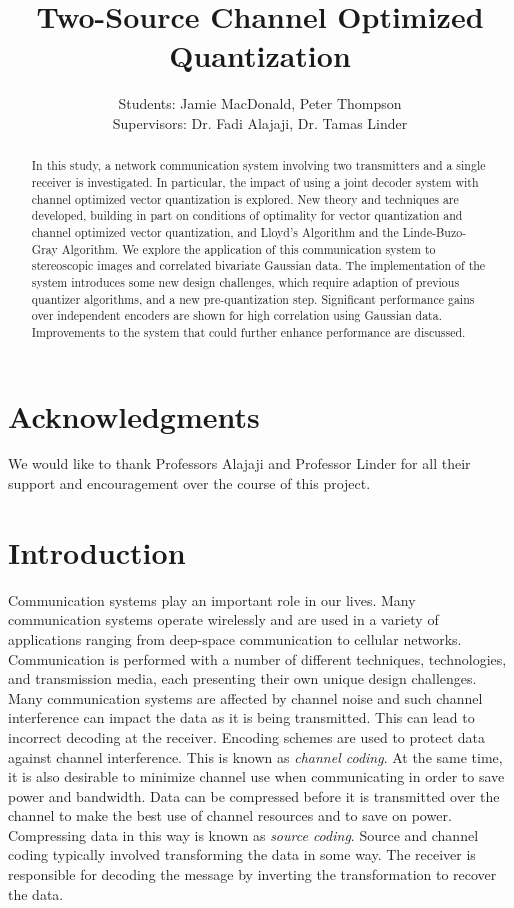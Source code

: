 \documentclass[10pt,twoside,titlepage]{article}
\begin{document}
\title{Two-Source Channel Optimized Quantization}
\author{Students: Jamie MacDonald, Peter Thompson  \\ Supervisors: Dr. Fadi Alajaji, Dr. Tamas Linder}
\maketitle


\section{Acknowledgments}
We would like to thank Professors Alajaji and Professor Linder for all their support and encouragement over the course of this project.

\begin{abstract}
In this study, a network communication system involving two transmitters and a single receiver is investigated. In particular, the impact of using a joint decoder system with channel optimized vector quantization is explored. New theory and techniques are developed, building in part on conditions of optimality for vector quantization and channel optimized vector quantization, and Lloyd's Algorithm and the Linde-Buzo-Gray Algorithm. We explore the application of this communication system to stereoscopic images and correlated bivariate Gaussian data. The implementation of the system introduces some new design challenges, which require adaption of previous quantizer algorithms, and a new pre-quantization step. Significant performance gains over independent encoders are shown  for high correlation using Gaussian data. Improvements to the system that could further enhance performance are discussed.
\end{abstract}

\tableofcontents

\section{Introduction}
Communication systems play an important role in our lives. Many communication systems operate wirelessly and are used in a variety of applications ranging from deep-space communication to cellular networks. Communication is performed with a number of different techniques, technologies, and transmission media, each presenting their own unique design challenges. Many communication systems are affected by channel noise and such channel interference can impact the data as it is being transmitted. This can lead to incorrect decoding at the receiver. Encoding schemes are used to protect data against channel interference. This is known as \emph{channel coding}. At the same time, it is also desirable to minimize channel use when communicating in order to save power and bandwidth. Data can be compressed before it is transmitted over the channel to make the best use of channel resources and to save on power. Compressing data in this way is known as \emph{source coding}. Source and channel coding typically involved transforming the data in some way. The receiver is responsible for decoding the message by inverting the transformation to recover the data.
\end{document}
